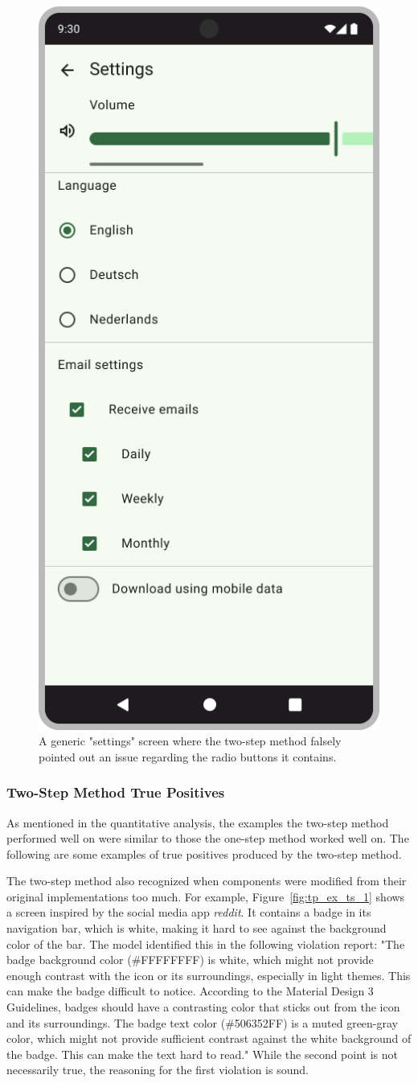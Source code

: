 \documentclass[11pt,titlepage,oneside,openany]{book}
\begin{document}
\begin{figure}[t]
	\centering
	\includegraphics[width=.28\textwidth]{figures/fp_ex_ts_5.jpg}
	\caption{A generic "settings" screen where the two-step method falsely pointed out an issue regarding the radio buttons it contains.}
	\label{fig:fp_ex_ts_5}
\end{figure}

\subsubsection{Two-Step Method True Positives}

As mentioned in the quantitative analysis, the examples the two-step method performed well on were similar to those the one-step method worked well on. The following are some examples of true positives produced by the two-step method.

The two-step method also recognized when components were modified from their original implementations too much. For example, Figure~\ref{fig:tp_ex_ts_1} shows a screen inspired by the social media app \emph{reddit}. It contains a badge in its navigation bar, which is white, making it hard to see against the background color of the bar. The model identified this in the following violation report: "The badge background color (\#FFFFFFFF) is white, which might not provide enough contrast with the icon or its surroundings, especially in light themes. This can make the badge difficult to notice. According to the Material Design 3 Guidelines, badges should have a contrasting color that sticks out from the icon and its surroundings. The badge text color (\#506352FF) is a muted green-gray color, which might not provide sufficient contrast against the white background of the badge. This can make the text hard to read." While the second point is not necessarily true, the reasoning for the first violation is sound. 
\end{document}
